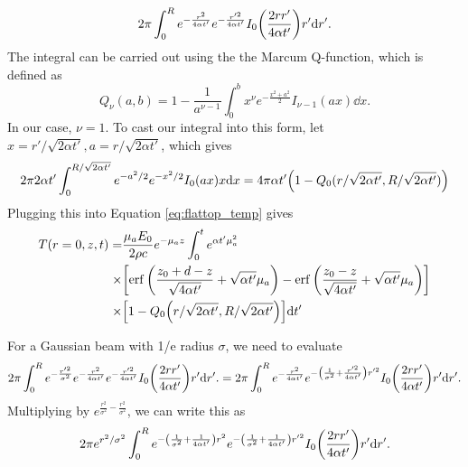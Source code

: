 \documentclass[]{article}
\begin{document}
\begin{equation*}
  2\pi \int_0^R  e^{-\frac{r^2}{4\alpha t'}}e^{-\frac{r'^2}{4\alpha t'}}I_0\qty(\frac{2rr'}{4\alpha t'}) r'\dd r'.
\end{equation*}
The integral can be carried out using the the Marcum Q-function, which is defined as
\begin{equation*}
Q_\nu(a,b) = 1 - \frac{1}{a^{\nu-1}}\int_0^b x^\nu e^{-\frac{x^2 + a^2}{2}} I_{\nu-1}(ax) \dd x.
\end{equation*}
In our case, $\nu=1$.
To cast our integral into this form, let $x = r'/\sqrt{2\alpha t'}, a = r/\sqrt{2\alpha t'}$, which gives
\begin{equation*}
  2\pi 2\alpha t' \int_0^{R/\sqrt{2\alpha t'}} e^{-a^2/2}e^{-x^2/2}I_0\qty(ax) x\dd x= 4\pi\alpha t' \qty(1 - Q_0(r/\sqrt{2\alpha t'},R/\sqrt{2\alpha t'}))
\end{equation*}
Plugging this into Equation \ref{eq:flattop_temp} gives
\begin{align}
  \label{eq:flattop_off_axis_temp}
  T(r=0, z,t) =& \frac{\mu_aE_0}{2\rho c}e^{-\mu_a z} \int_0^t e^{\alpha t'\mu_a^2}  \nonumber \\
  \times & \qty[\erf\qty(\frac{z_0 + d - z}{\sqrt{4\alpha t'}} + \sqrt{\alpha t'}\mu_a ) - \erf\qty(\frac{z_0 - z}{\sqrt{4\alpha t'}} + \sqrt{\alpha t'}\mu_a ) ] \nonumber \\
  \times & \qty[1 - Q_0\qty(r/\sqrt{2\alpha t'},R/\sqrt{2\alpha t'}) ]
  \dd t'
\end{align}




For a Gaussian beam with 1/e radius $\sigma$, we need to evaluate
\begin{equation*}
  2\pi \int_0^R  
e^{-\frac{r'^2}{\sigma^2}} 
  e^{-\frac{r^2}{4\alpha t'}}e^{-\frac{r'^2}{4\alpha t'}}I_0\qty(\frac{2rr'}{4\alpha t'}) r'\dd r'.
  = 
  2\pi \int_0^R  
  e^{-\frac{r^2}{4\alpha t'}}e^{-\qty(\frac{1}{\sigma^2} + \frac{r'^2}{4\alpha t'})r'^2} 
  I_0\qty(\frac{2rr'}{4\alpha t'}) r'\dd r'.
\end{equation*}
Multiplying by $e^{\frac{r^2}{\sigma^2} - \frac{r^2}{\sigma^2}}$, we can write this as
\begin{equation*}
  2\pi e^{r^2/\sigma^2} \int_0^R  
  e^{-\qty(\frac{1}{\sigma^2} + \frac{1}{4\alpha t'})r^2 }e^{-\qty(\frac{1}{\sigma^2} + \frac{1}{4\alpha t'})r'^2} 
  I_0\qty(\frac{2rr'}{4\alpha t'}) r'\dd r'.
\end{equation*}
\end{document}
